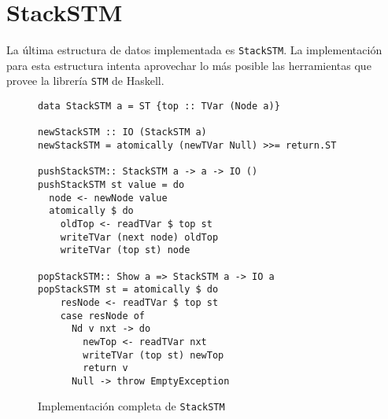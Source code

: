 \clearpage
\section{StackSTM}
La última estructura de datos implementada es \texttt{StackSTM}. La implementación para esta estructura intenta aprovechar lo más posible las herramientas que provee la librería \texttt{STM} de Haskell.

\begin{figure}[H]
\begin{verbatim}
data StackSTM a = ST {top :: TVar (Node a)}

newStackSTM :: IO (StackSTM a)
newStackSTM = atomically (newTVar Null) >>= return.ST

pushStackSTM:: StackSTM a -> a -> IO ()
pushStackSTM st value = do
  node <- newNode value
  atomically $ do
    oldTop <- readTVar $ top st
    writeTVar (next node) oldTop
    writeTVar (top st) node

popStackSTM:: Show a => StackSTM a -> IO a
popStackSTM st = atomically $ do
    resNode <- readTVar $ top st
    case resNode of
      Nd v nxt -> do
        newTop <- readTVar nxt
        writeTVar (top st) newTop
        return v
      Null -> throw EmptyException   
\end{verbatim}
\caption{Implementación completa de \texttt{StackSTM}}
\end{figure}